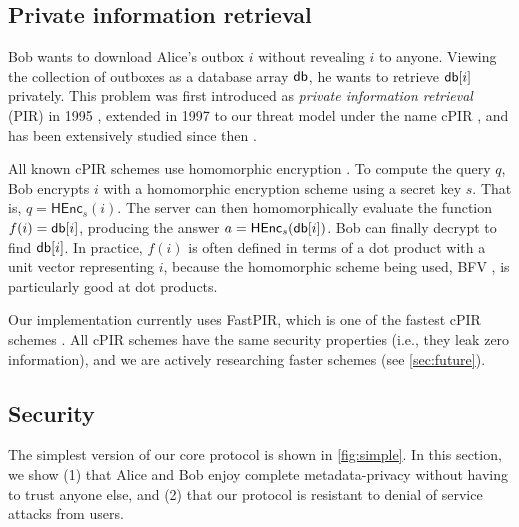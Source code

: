 \subsection{Private information retrieval}

Bob wants to download Alice's outbox $i$ without revealing $i$ to anyone. Viewing the collection of outboxes as a database array $\mathsf{db}$, he wants to retrieve $\mathsf{db}[i]$ privately. This problem was first introduced as \textit{private information retrieval} (PIR) in 1995 \cite{chor1995private}, extended in 1997 to our threat model under the name cPIR \cite{kushilevitz1997replication}, and has been extensively studied since then \cite{melchor2016xpir,angel2018pir, ahmad2021addra}.

All known cPIR schemes use homomorphic encryption \cite{gentry2010computing}. To compute the query $q$, Bob encrypts $i$ with a homomorphic encryption scheme using a secret key $s$. That is, $q = \mathsf{HEnc}_s(i)$. The server can then homomorphically evaluate the function $f(i) = \mathsf{db}[i]$, producing the answer $a = \mathsf{HEnc}_s(\mathsf{db}[i])$. Bob can finally decrypt to find $\mathsf{db}[i]$. In practice, $f(i)$ is often defined in terms of a dot product with a unit vector representing $i$, because the homomorphic scheme being used, BFV \cite{fan2012somewhat}, is particularly good at dot products.

Our implementation currently uses FastPIR, which is one of the fastest cPIR schemes \cite{ahmad2021addra}. All cPIR schemes have the same security properties (i.e., they leak zero information), and we are actively researching faster schemes (see \cref{sec:future}).

\subsection{Security}

The simplest version of our core protocol is shown in \cref{fig:simple}. In this section, we show (1) that Alice and Bob enjoy complete metadata-privacy without having to trust anyone else, and (2) that our protocol is resistant to denial of service attacks from users.




